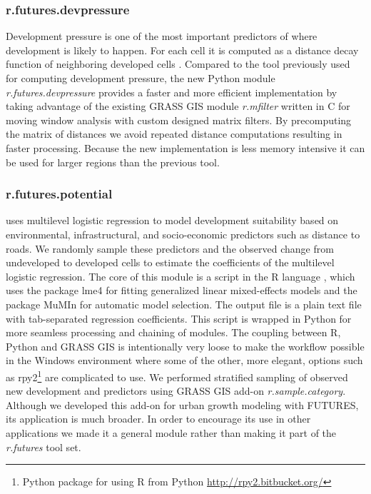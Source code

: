 \documentclass{isprs}
\begin{document}
\subsubsection{r.futures.devpressure}
Development pressure is one of the most
important predictors of where development is likely to happen.
For each cell it is computed as a distance decay function of neighboring
developed cells \cite{Meentemeyer2012}.
Compared to the tool previously used for computing development pressure,
the new Python module \emph{r.futures.devpressure} provides a faster and more efficient 
implementation by taking advantage of the existing GRASS GIS 
module \emph{r.mfilter} written in C for moving window analysis with custom designed matrix filters.
By precomputing the matrix of distances we avoid repeated distance computations
resulting in faster processing. 
Because the new implementation
is less memory intensive 
it can be used for
larger regions than the previous tool. 

\subsubsection{r.futures.potential}
uses multilevel logistic regression  to model development
suitability based on environmental, infrastructural, and socio-economic predictors such as distance to roads.
We randomly sample these predictors and the observed change from undeveloped to developed cells
to estimate the coefficients of the multilevel logistic regression.
The core of this
module is a script in the R language \cite{rstats}, which uses the package lme4 \cite{lme4}
for fitting generalized linear mixed-effects models and the package MuMIn \cite{mumin}
for automatic model selection.
The output file is a plain text file with tab-separated regression coefficients.
This script is wrapped in Python for more seamless processing
and chaining of modules. 
The coupling between R, Python and GRASS GIS
is intentionally very loose to make the workflow possible in the Windows environment
where some of the other, more elegant, options such as
rpy2\footnote{Python package for using R from Python \url{http://rpy2.bitbucket.org/}} are complicated to use.
We performed stratified sampling of observed new development and predictors using GRASS GIS add-on \emph{r.sample.category}. 
Although we developed this add-on for urban growth modeling with FUTURES,
its application is much broader. 
In order to encourage its use in other applications we made it a general module rather than making it part of the \emph{r.futures} tool set.
\end{document}
